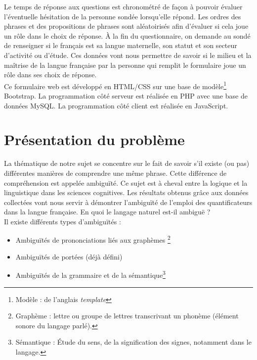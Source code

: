\documentclass[11pt,letterpaper]{article}
\begin{document}
\vspace{8px}

Le temps de réponse aux questions est chronométré de façon à pouvoir évaluer l'éventuelle hésitation de la personne sondée lorsqu'elle répond. Les ordres des phrases et des propositions de phrases sont aléatoirisés afin d'évaluer si cela joue un rôle dans le choix de réponse. À la fin du questionnaire, on demande au sondé de renseigner si le français est sa langue maternelle, son statut et son secteur d'activité ou d'étude. Ces données vont nous permettre de savoir si le milieu et la maîtrise de la langue française par la personne qui remplit le formulaire joue un rôle dans ses choix de réponse.\\

Ce formulaire web est développé en HTML/CSS sur une base de modèle\footnote{Modèle : de l'anglais \textit{template}} Bootstrap. La programmation côté serveur est réalisée en PHP avec une base de données MySQL. La programmation côté client est réalisée en JavaScript.
\newpage

\part{Présentation du problème}
La thématique de notre sujet se concentre sur le fait de savoir s'il existe (ou pas) différentes manières de comprendre une même phrase. Cette différence de compréhension est appelée ambiguïté. Ce sujet est à cheval entre la logique et la linguistique dans les sciences cognitives. Les résultats obtenus grâce aux données collectées vont nous servir à démontrer l'ambiguïté de l'emploi des quantificateurs dans la langue française. En quoi le langage naturel est-il ambiguë ?\\

Il existe différents types d'ambiguïtés :
\begin{itemize}
    \item Ambiguïtés de prononciations liés aux graphèmes \footnote{Graphème : lettre ou groupe de lettres transcrivant un phonème (élément sonore du langage parlé).}
    \item Ambiguïtés de portées (déjà défini)
    \item Ambiguïtés de la grammaire et de la sémantique\footnote{Sémantique : Étude du sens, de la signification des signes, notamment dans le langage.}
\end{itemize}

\vspace{5px}
\end{document}
